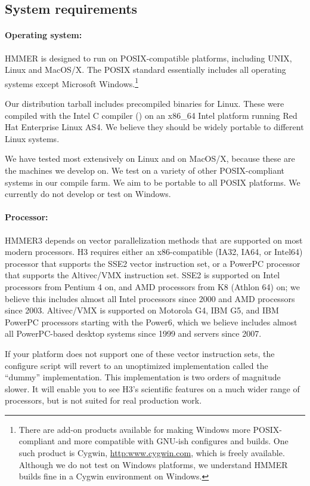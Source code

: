 \subsection{System requirements}

\paragraph{Operating system:} HMMER is designed to run on
POSIX-compatible platforms, including UNIX, Linux and MacOS/X.  The
POSIX standard essentially includes all operating systems except
Microsoft Windows.\footnote{There are add-on products available for
  making Windows more POSIX-compliant and more compatible with GNU-ish
  configures and builds. One such product is Cygwin,
  \url{http:www.cygwin.com}, which is freely available. Although we do
  not test on Windows platforms, we understand HMMER builds fine in a
  Cygwin environment on Windows.}

Our distribution tarball includes precompiled binaries for
Linux. These were compiled with the Intel C compiler () on
an x86\_64 Intel platform running Red Hat Enterprise Linux AS4. We
believe they should be widely portable to different Linux systems.

We have tested most extensively on Linux and on MacOS/X, because these
are the machines we develop on. We test on a variety of other
POSIX-compliant systems in our compile farm.  We aim to be portable to
all POSIX platforms. We currently do not develop or test on Windows.


\paragraph{Processor:} HMMER3 depends on vector parallelization methods
that are supported on most modern processors. H3 requires either an
x86-compatible (IA32, IA64, or Intel64) processor that supports the
SSE2 vector instruction set, or a PowerPC processor that supports the
Altivec/VMX instruction set. SSE2 is supported on Intel processors
from Pentium 4 on, and AMD processors from K8 (Athlon 64) on; we
believe this includes almost all Intel processors since 2000 and AMD
processors since 2003. Altivec/VMX is supported on Motorola G4, IBM
G5, and IBM PowerPC processors starting with the Power6, which we
believe includes almost all PowerPC-based desktop systems since 1999
and servers since 2007.

If your platform does not support one of these vector instruction
sets, the configure script will revert to an unoptimized
implementation called the ``dummy'' implementation. This
implementation is two orders of magnitude slower. It will enable you
to see H3's scientific features on a much wider range of processors,
but is not suited for real production work.

